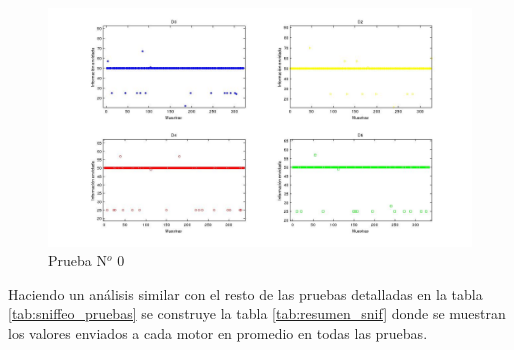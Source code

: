 \documentclass[main]{subfiles}
\begin{document}
\begin{figure}[h!]
	\centering
	\includegraphics[width=1\textwidth]{./pics_sniffer/grafica_ejemplo.jpg}
	\caption{Prueba N$^o$ $0$}
	\label{fig:grafica_motores}
\end{figure}


Haciendo un an\'alisis similar con el resto de las pruebas detalladas en la tabla \ref{tab:sniffeo_pruebas} se construye la tabla \ref{tab:resumen_snif} donde se muestran los valores enviados a cada motor en promedio en todas las pruebas.\\
\end{document}
